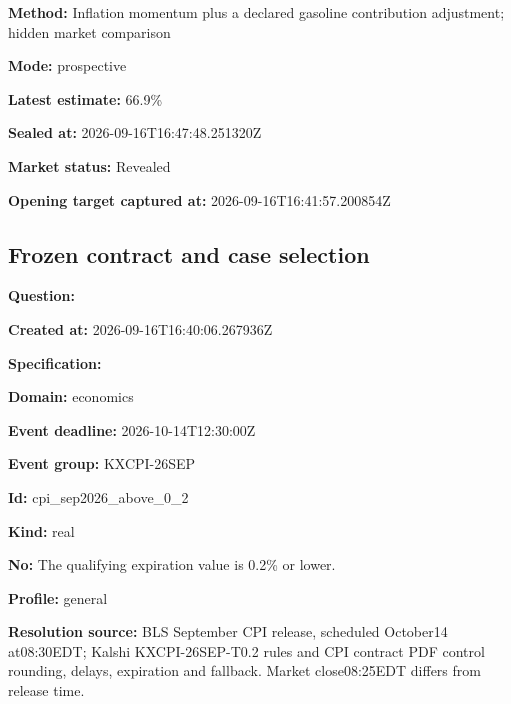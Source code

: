\documentclass[11pt]{article}
\begin{document}
\par\noindent\textbf{Method:} Inflation momentum plus a declared gasoline contribution adjustment; hidden market comparison

\par\noindent\textbf{Mode:} prospective

\par\noindent\textbf{Latest estimate:} 66.9\%

\par\noindent\textbf{Sealed at:} 2026-09-16T16:47:48.251320Z

\par\noindent\textbf{Market status:} Revealed

\par\noindent\textbf{Opening target captured at:} 2026-09-16T16:41:57.200854Z

\subsection*{\textcolor{epdarkgreen}{Frozen contract and case selection}}
\par\noindent\textbf{Question:} \par \par\noindent\textbf{Created at:} 2026-09-16T16:40:06.267936Z

\par\noindent\textbf{Specification:} \par \par\noindent\textbf{Domain:} economics

\par\noindent\textbf{Event deadline:} 2026-10-14T12:30:00Z

\par\noindent\textbf{Event group:} KXCPI-26SEP

\par\noindent\textbf{Id:} cpi\_sep2026\_above\_0\_2

\par\noindent\textbf{Kind:} real

\par\noindent\textbf{No:} The qualifying expiration value is 0.2\% or lower.

\par\noindent\textbf{Profile:} general

\par\noindent\textbf{Resolution source:} BLS September CPI release, scheduled October14 at08:30EDT; Kalshi KXCPI-26SEP-T0.2 rules and CPI contract PDF control rounding, delays, expiration and fallback. Market close08:25EDT differs from release time.
\end{document}
